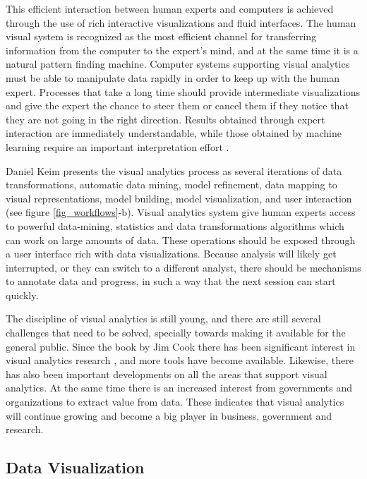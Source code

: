 This efficient interaction between human experts and computers is achieved through the use of rich interactive visualizations and fluid interfaces. The human visual system is recognized as the most efficient channel for transferring information from the computer to the expert's mind, and at the same time it is a natural pattern finding machine. Computer systems supporting visual analytics must be able to manipulate data rapidly in order to keep up with the human expert. Processes that take a long time should provide intermediate visualizations and give the expert the chance to steer them or cancel them if they notice that they are not going in the right direction. Results obtained through expert interaction are immediately understandable, while those obtained by machine learning require an important interpretation effort \autocite{stahl_overview_2013}.

Daniel Keim presents the visual analytics process as several iterations of data transformations, automatic data mining, model refinement, data mapping to visual representations, model building, model visualization, and user interaction \autocite{keim_mastering_2010} (see figure \ref{fig_workflows}-b). Visual analytics system give human experts access to powerful data-mining, statistics and data transformations algorithms which can work on large amounts of data. These operations should be exposed through a user interface rich with data visualizations. Because analysis will likely get interrupted, or they can switch to a different analyst, there should be mechanisms to annotate data and progress, in such a way that the next session can start quickly. 

The discipline of visual analytics is still young, and there are still several challenges that need to be solved, specially towards making it available for the general public\autocite{kwon_visual_2011}. Since the book by Jim Cook there has been significant interest in visual analytics research \autocite{chen_illuminated_2012}, and more tools have become available. Likewise, there has also been important developments on all the areas that support visual analytics. At the same time there is an increased interest from governments and organizations to extract value from data. These indicates that visual analytics will continue growing and become a big player in business, government and research.


\subsection{Data Visualization}

